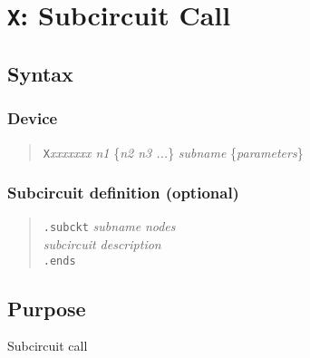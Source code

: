 %
%
%
%
\section{{\tt X}: Subcircuit Call}
\subsection{Syntax}
\subsubsection{Device}
\begin{verse}
{\tt X}{\it xxxxxxx n1} \{{\it n2 n3 ...}\} 
	{\it subname} \{{\it parameters}\}
\end{verse}
\subsubsection{Subcircuit definition (optional)}
\begin{verse}
{\tt .subckt} {\it subname} {\it nodes}\\
{\it subcircuit description}\\
{\tt .ends}
\end{verse}
\subsection{Purpose}

Subcircuit call

